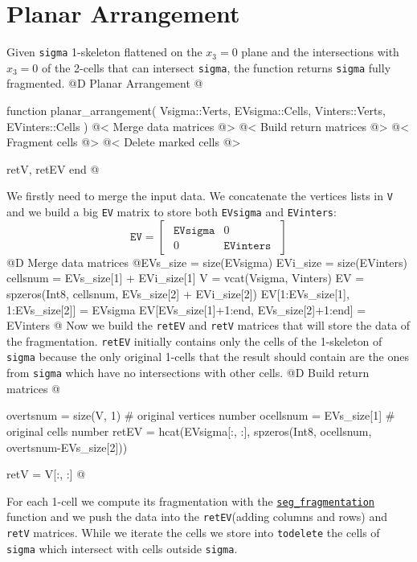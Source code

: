 \documentclass[10pt,oneside]{article}
\begin{document}
\section{Planar Arrangement}
Given \texttt{sigma} 1-skeleton flattened on the $x_3=0$ plane and the intersections with $x_3=0$ of the 2-cells
that can intersect \texttt{sigma}, the function returns \texttt{sigma} fully fragmented.
@D Planar Arrangement
@{function planar_arrangement(
    Vsigma::Verts, EVsigma::Cells, 
    Vinters::Verts, EVinters::Cells
)
    @< Merge data matrices @>
    @< Build return matrices @>
    @< Fragment cells @>
    @< Delete marked cells @>

    retV, retEV
end
@}
We firstly need to merge the input data. We concatenate the vertices lists in \texttt{V} and 
we build a big \texttt{EV} matrix to store both \texttt{EVsigma} and \texttt{EVinters}:
\[
    \texttt{EV} = 
    \begin{bmatrix}
        \begin{array}{c|c}
            \texttt{EVsigma} & 0 \\ 
            \hline
            0 & \texttt{EVinters}
        \end{array}
    \end{bmatrix}
\]
@D Merge data matrices
@{EVs_size = size(EVsigma)
EVi_size = size(EVinters)
cellsnum = EVs_size[1] + EVi_size[1]
V = vcat(Vsigma, Vinters)
EV = spzeros(Int8, cellsnum, EVs_size[2] + EVi_size[2])
EV[1:EVs_size[1], 1:EVs_size[2]] = EVsigma
EV[EVs_size[1]+1:end, EVs_size[2]+1:end] = EVinters
@}
Now we build the \texttt{retEV} and \texttt{retV} matrices that will store 
the data of the fragmentation. \texttt{retEV} initially contains only the cells 
of the 1-skeleton of \texttt{sigma} because the only original 1-cells that the 
result should contain are the ones from \texttt{sigma} which have no intersections 
with other cells.
@D Build return matrices
@{overtsnum = size(V, 1)  # original vertices number
ocellsnum = EVs_size[1]  # original cells number
retEV = hcat(EVsigma[:, :], spzeros(Int8, ocellsnum, overtsnum-EVs_size[2]))

retV = V[:, :]
@}
For each 1-cell we compute its fragmentation with the \hyperref[seg_fragmentation]{\texttt{seg\_fragmentation}} 
function and we push the data into the \texttt{retEV}(adding columns and rows) and \texttt{retV} matrices.
While we iterate the cells we store into \texttt{todelete} the cells of \texttt{sigma} which 
intersect with cells outside \texttt{sigma}.
\end{document}
